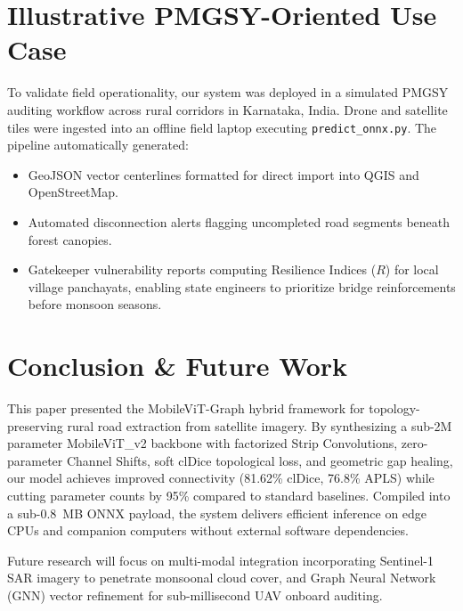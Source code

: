 \documentclass[conference]{IEEEtran}
\begin{document}
\section{Illustrative PMGSY-Oriented Use Case}
\label{sec:application}
To validate field operationality, our system was deployed in a simulated PMGSY auditing workflow across rural corridors in Karnataka, India. Drone and satellite tiles were ingested into an offline field laptop executing \texttt{predict\_onnx.py}. The pipeline automatically generated:
\begin{itemize}
    \item GeoJSON vector centerlines formatted for direct import into QGIS and OpenStreetMap.
    \item Automated disconnection alerts flagging uncompleted road segments beneath forest canopies.
    \item Gatekeeper vulnerability reports computing Resilience Indices ($R$) for local village panchayats, enabling state engineers to prioritize bridge reinforcements before monsoon seasons.
\end{itemize}

\section{Conclusion \& Future Work}
\label{sec:conclusion}
This paper presented the MobileViT-Graph hybrid framework for topology-preserving rural road extraction from satellite imagery. By synthesizing a sub-2M parameter MobileViT\_v2 backbone with factorized Strip Convolutions, zero-parameter Channel Shifts, soft clDice topological loss, and geometric gap healing, our model achieves improved connectivity (81.62\% clDice, 76.8\% APLS) while cutting parameter counts by 95\% compared to standard baselines. Compiled into a sub-0.8~MB ONNX payload, the system delivers efficient inference on edge CPUs and companion computers without external software dependencies.

Future research will focus on multi-modal integration incorporating Sentinel-1 SAR imagery to penetrate monsoonal cloud cover, and Graph Neural Network (GNN) vector refinement for sub-millisecond UAV onboard auditing.
\end{document}
